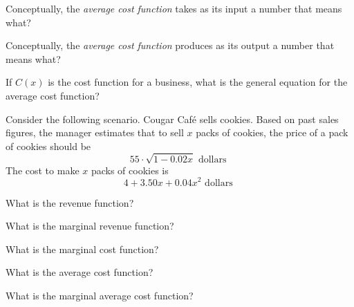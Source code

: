 
\begin{ProblemSet}[pencil space=1in]
 \begin{Problem}
  Conceptually, the \emph{average cost function} takes as its input a number that means what?
 \end{Problem}
 \begin{Problem}
  Conceptually, the \emph{average cost function} produces as its output a number that means what?
 \end{Problem}
 \begin{Problem}
  If $C(x)$ is the cost function for a business, what is the general equation for the average cost function?
 \end{Problem}
\end{ProblemSet}

Consider the following scenario.
Cougar Caf\'e sells cookies.
Based on past sales figures, the manager estimates that to sell $x$ packs of cookies, the price of a pack of cookies should be
\begin{equation*}
 55 \cdot \sqrt{1 - 0.02 x} \text{ dollars }
\end{equation*}
The cost to make $x$ packs of cookies is
\begin{equation*}
 4 + 3.50 x + 0.04 x^2 \text{ dollars }
\end{equation*}

\begin{ProblemSet}
 \begin{Problem}[pencil space=2in]
  What is the revenue function?
 \end{Problem}
 \begin{Problem}
  What is the marginal revenue function?
 \end{Problem}
 \begin{Problem}
  What is the marginal cost function?
 \end{Problem}
 \begin{Problem}[pencil space=2in]
  What is the average cost function?
 \end{Problem}
 \begin{Problem}
  What is the marginal average cost function?
 \end{Problem}
\end{ProblemSet}

